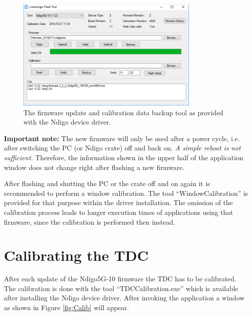 		\begin{figure}[ht]
			\begin{center}
				\includegraphics[width=0.8\textwidth]{figures/Firmware.pdf}
				\caption{\label{fig:Firmware}The firmware update and calibration data backup tool as provided with the Ndigo device driver.}
			\end{center}
		\end{figure}

\textbf{Important note:} The new firmware will only be used after a power cycle, i.e. after switching the PC (or Ndigo crate) off and back on. \emph{A simple reboot is not sufficient.} Therefore, the information shown in the upper half of the application window does not change right after flashing a new firmware.\par
After flashing and shutting the PC or the crate off and on again it is recommended to perform a window calibration. The tool ``WindowCalibration'' is provided for that purpose within the driver installation. The omission of the calibration process leads to longer execution times of applications using that firmware, since the calibration is performed then instead.
	
	\section{Calibrating the TDC}
	
		After each update of the Ndigo5G-10 firmware the TDC has to be calibrated. The calibration is done with the tool ``TDC\tu Calibration.exe'' which is available after installing the Ndigo device driver. After invoking the application a window as shown in Figure \ref{fig:Calib} will appear.\par

